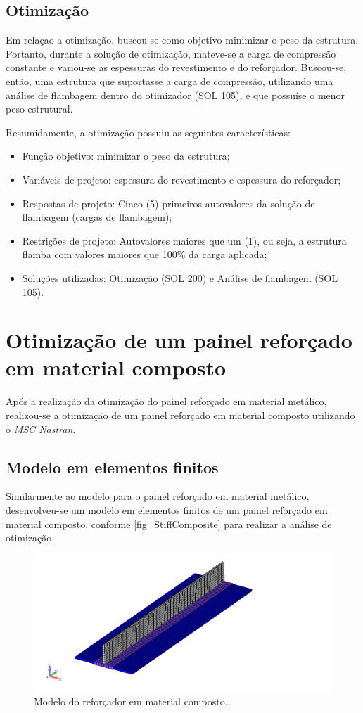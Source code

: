 {\subsection{Otimização}
Em relaçao a otimização, buscou-se como objetivo minimizar o peso da estrutura. Portanto, durante a solução de otimização, mateve-se a carga de compressão constante e variou-se as espessuras do revestimento e do reforçador. Buscou-se, então, uma estrutura que suportasse a carga de compressão, utilizando uma análise de flambagem dentro do otimizador (SOL 105), e que possuíse o menor peso estrutural.

Resumidamente, a otimização possuiu as seguintes características:
\begin{itemize}
\item Função objetivo: minimizar o peso da estrutura;
\item Variáveis de projeto: espessura do revestimento e espessura do reforçador;
\item Respostas de projeto: Cinco (5) primeiros autovalores da solução de flambagem (cargas de flambagem);
\item Restrições de projeto: Autovalores maiores que um (1), ou seja, a estrutura flamba com valores maiores que 100\% da carga aplicada;
\item Soluções utilizadas: Otimização (SOL 200) e Análise de flambagem (SOL 105).
\end{itemize}

\section{Otimização de um painel reforçado em material composto}
Após a realização da otimização do painel reforçado em material metálico, realizou-se a otimização de um painel reforçado em material composto utilizando o \emph{MSC Nastran}.

\subsection{Modelo em elementos finitos}
Similarmente ao modelo para o painel reforçado em material metálico, desenvolveu-se um modelo em elementos finitos de um painel reforçado em material composto, conforme \autoref{fig_StiffComposite} para realizar a análise de otimização.

\begin{figure}[ht]
 \caption{\label{fig_StiffComposite}Modelo do reforçador em material composto.}
 \centering
 \includegraphics[scale=0.7]{figura/StiffComposite}
\end{figure}
\

}
